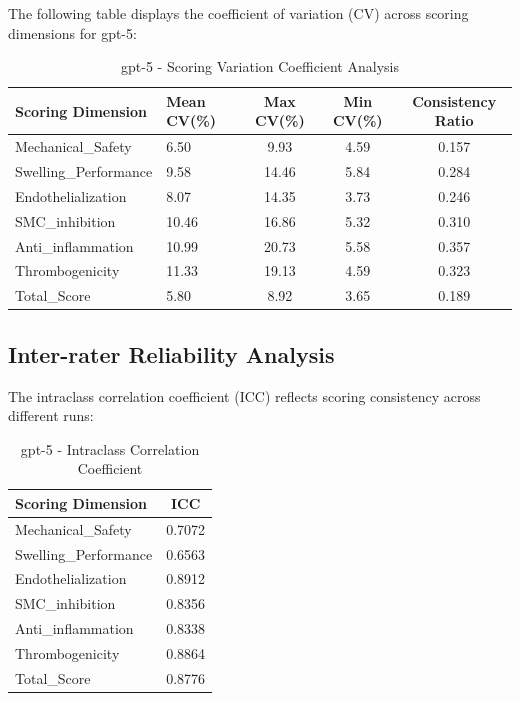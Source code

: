 \documentclass[12pt,a4paper]{article}
\begin{document}
The following table displays the coefficient of variation (CV) across scoring dimensions for gpt-5:

\begin{table}[H]
\centering
\caption{gpt-5 - Scoring Variation Coefficient Analysis}
\begin{tabular}{llccc}
\toprule
\textbf{Scoring Dimension} & \textbf{Mean CV(\%)} & \textbf{Max CV(\%)} & \textbf{Min CV(\%)} & \textbf{Consistency Ratio} \\
\midrule
Mechanical\_Safety & 6.50 & 9.93 & 4.59 & 0.157 \\
Swelling\_Performance & 9.58 & 14.46 & 5.84 & 0.284 \\
Endothelialization & 8.07 & 14.35 & 3.73 & 0.246 \\
SMC\_inhibition & 10.46 & 16.86 & 5.32 & 0.310 \\
Anti\_inflammation & 10.99 & 20.73 & 5.58 & 0.357 \\
Thrombogenicity & 11.33 & 19.13 & 4.59 & 0.323 \\
Total\_Score & 5.80 & 8.92 & 3.65 & 0.189 \\
\bottomrule
\end{tabular}
\end{table}

\subsection{Inter-rater Reliability Analysis}

The intraclass correlation coefficient (ICC) reflects scoring consistency across different runs:

\begin{table}[H]
\centering
\caption{gpt-5 - Intraclass Correlation Coefficient}
\begin{tabular}{lc}
\toprule
\textbf{Scoring Dimension} & \textbf{ICC} \\
\midrule
Mechanical\_Safety & 0.7072 \\
Swelling\_Performance & 0.6563 \\
Endothelialization & 0.8912 \\
SMC\_inhibition & 0.8356 \\
Anti\_inflammation & 0.8338 \\
Thrombogenicity & 0.8864 \\
Total\_Score & 0.8776 \\
\bottomrule
\end{tabular}
\end{table}
\end{document}
